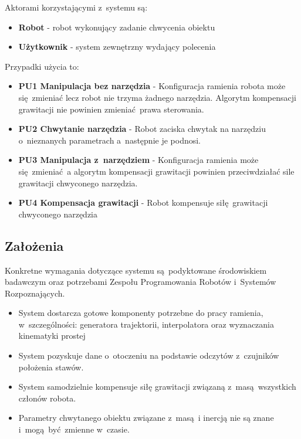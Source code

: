 Aktorami korzystającymi z~systemu są:
\begin{itemize}
	\item \textbf{Robot} - robot wykonujący zadanie chwycenia obiektu
	\item \textbf{Użytkownik} - system zewnętrzny wydający polecenia
\end{itemize}


Przypadki użycia to:
\begin{itemize}
	\item \textbf{PU1 Manipulacja bez narzędzia} - Konfiguracja ramienia robota może się zmieniać lecz robot nie trzyma żadnego narzędzia. Algorytm kompensacji grawitacji nie powinien zmieniać prawa sterowania. 
	\item \textbf{PU2 Chwytanie narzędzia} - Robot zaciska chwytak na narzędziu o~nieznanych parametrach a~następnie je podnosi.  
	\item \textbf{PU3 Manipulacja z~narzędziem} - Konfiguracja ramienia może się zmieniać a algorytm kompensacji grawitacji powinien przeciwdziałać sile grawitacji chwyconego narzędzia.
	\item \textbf{PU4 Kompensacja grawitacji} - Robot kompensuje siłę grawitacji chwyconego narzędzia
\end{itemize}

\subsection{Założenia}
Konkretne wymagania dotyczące systemu są podyktowane środowiskiem badawczym oraz potrzebami Zespołu Programowania Robotów i~Systemów Rozpoznających. 
\begin{itemize}
	\item System dostarcza gotowe komponenty potrzebne do pracy ramienia, w~szczególności: generatora trajektorii, interpolatora oraz wyznaczania kinematyki prostej 
	\item System pozyskuje dane o~otoczeniu na podstawie odczytów z~czujników położenia stawów.
	\item System samodzielnie kompensuje siłę grawitacji związaną z~masą wszystkich członów robota.
	\item Parametry chwytanego obiektu związane z~masą i inercją nie są znane i~mogą być zmienne w~czasie.
\end{itemize}

